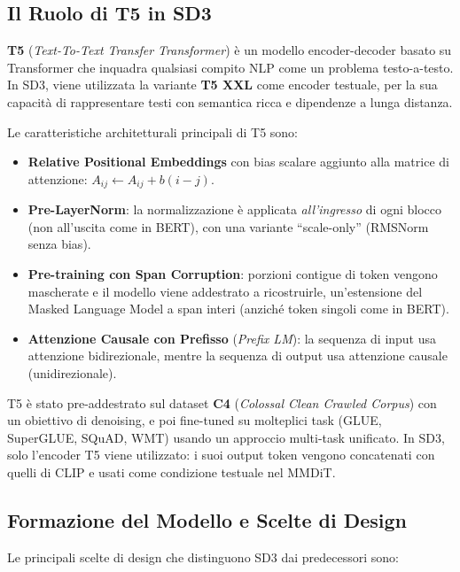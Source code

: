 \subsection{Il Ruolo di T5 in SD3}
\label{subsec:sd3-t5}

\textbf{T5} (\emph{Text-To-Text Transfer Transformer}) \citep{raffel2020t5}
è un modello encoder-decoder basato su Transformer che inquadra qualsiasi
compito NLP come un problema testo-a-testo. In SD3, viene utilizzata la
variante \textbf{T5 XXL} come encoder testuale, per la sua capacità di
rappresentare testi con semantica ricca e dipendenze a lunga distanza.

Le caratteristiche architetturali principali di T5 sono:

\begin{itemize}
  \item \textbf{Relative Positional Embeddings} con bias scalare aggiunto
        alla matrice di attenzione: $A_{ij} \leftarrow A_{ij} + b(i-j)$.
  \item \textbf{Pre-LayerNorm}: la normalizzazione è applicata
        \emph{all'ingresso} di ogni blocco (non all'uscita come in BERT),
        con una variante ``scale-only'' (RMSNorm senza bias).
  \item \textbf{Pre-training con Span Corruption}: porzioni contigue di
        token vengono mascherate e il modello viene addestrato a
        ricostruirle, un'estensione del Masked Language Model a span
        interi (anziché token singoli come in BERT).
  \item \textbf{Attenzione Causale con Prefisso} (\emph{Prefix LM}):
        la sequenza di input usa attenzione bidirezionale, mentre la
        sequenza di output usa attenzione causale (unidirezionale).
\end{itemize}

T5 è stato pre-addestrato sul dataset \textbf{C4} (\emph{Colossal Clean
Crawled Corpus}) con un obiettivo di denoising, e poi fine-tuned su
molteplici task (GLUE, SuperGLUE, SQuAD, WMT) usando un approccio
multi-task unificato. In SD3, solo l'encoder T5 viene utilizzato: i
suoi output token vengono concatenati con quelli di CLIP e usati come
condizione testuale nel MMDiT.

\subsection{Formazione del Modello e Scelte di Design}
\label{subsec:sd3-training}

Le principali scelte di design che distinguono SD3 dai predecessori sono:

